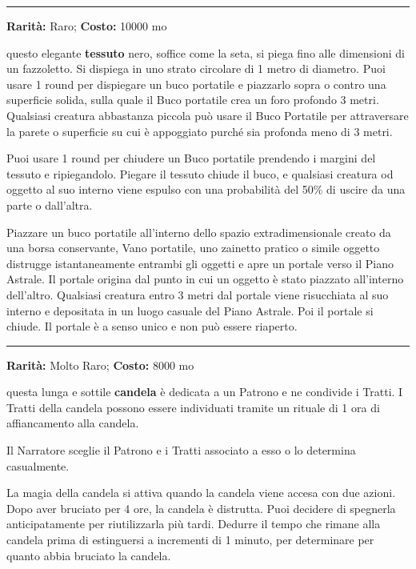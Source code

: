 \begin{multicols}{2}
\smallskip\noindent\rule{\linewidth}{2pt}  \hypertarget{BucoPortatile}{}\smallskip{}\noindent\label{BucoPortatile}

\textbf{Rarità:} Raro; \textbf{Costo:} 10000 mo

questo elegante \textbf{tessuto} nero, soffice come la seta, si piega fino alle dimensioni di un fazzoletto. Si dispiega in uno strato circolare di 1 metro di diametro. Puoi usare 1 round per dispiegare un buco portatile e piazzarlo sopra o contro una superficie solida, sulla quale il Buco portatile crea un foro profondo 3 metri. Qualsiasi creatura abbastanza piccola può usare il Buco Portatile per attraversare la parete o superficie su cui è appoggiato purché sia profonda meno di 3 metri.

Puoi usare 1 round per chiudere un Buco portatile prendendo i margini del tessuto e ripiegandolo. Piegare il tessuto chiude il buco, e qualsiasi creatura od oggetto al suo interno viene espulso con una probabilità del 50\% di uscire da una parte o dall'altra.

Piazzare un buco portatile all'interno dello spazio extradimensionale creato da una borsa conservante, Vano portatile, uno zainetto pratico o simile oggetto distrugge istantaneamente entrambi gli oggetti e apre un portale verso il Piano Astrale. Il portale origina dal punto in cui un oggetto è stato piazzato all'interno dell'altro. Qualsiasi creatura entro 3 metri dal portale viene risucchiata al suo interno e depositata in un luogo casuale del Piano Astrale. Poi il portale si chiude. Il portale è a senso unico e non può essere riaperto.

\smallskip\noindent\rule{\linewidth}{2pt}  \hypertarget{CandeladiInvocazione}{}\smallskip{}\noindent\label{CandeladiInvocazione}

\textbf{Rarità:} Molto Raro; \textbf{Costo:} 8000 mo

questa lunga e sottile \textbf{candela} è dedicata a un Patrono e ne condivide i Tratti. I Tratti della candela possono essere individuati tramite un rituale di 1 ora di affiancamento alla candela.

Il Narratore sceglie il Patrono e i Tratti associato a esso o lo determina casualmente.

La magia della candela si attiva quando la candela viene accesa con due azioni. Dopo aver bruciato per 4 ore, la candela è distrutta. Puoi decidere di spegnerla anticipatamente per riutilizzarla più tardi. Dedurre il tempo che rimane alla candela prima di estinguersi a incrementi di 1 minuto, per determinare per quanto abbia bruciato la candela.


\end{multicols}
